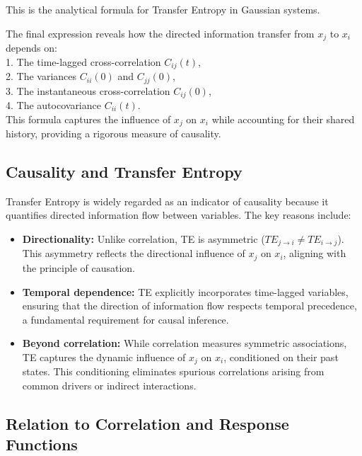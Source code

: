 \documentclass[English, Lau, oneside]{sapthesis}
\begin{document}
This is the analytical formula for Transfer Entropy in Gaussian systems.

The final expression reveals how the directed information transfer from \(x_j\) to \(x_i\) depends on:\\
1. The time-lagged cross-correlation \(C_{ij}(t)\),\\
2. The variances \(C_{ii}(0)\) and \(C_{jj}(0)\),\\
3. The instantaneous cross-correlation \(C_{ij}(0)\),\\
4. The autocovariance \(C_{ii}(t)\).\\

This formula captures the influence of \(x_j\) on \(x_i\) while accounting for their shared history, providing a rigorous measure of causality.

\subsection{Causality and Transfer Entropy}

\noindent Transfer Entropy is widely regarded as an indicator of causality because it quantifies directed information flow between variables. The key reasons include:

\begin{itemize}
    \item \textbf{Directionality:} Unlike correlation, TE is asymmetric (\(TE_{j \to i} \neq TE_{i \to j}\)). This asymmetry reflects the directional influence of \(x_j\) on \(x_i\), aligning with the principle of causation.
    \item \textbf{Temporal dependence:} TE explicitly incorporates time-lagged variables, ensuring that the direction of information flow respects temporal precedence, a fundamental requirement for causal inference.
    \item \textbf{Beyond correlation:} While correlation measures symmetric associations, TE captures the dynamic influence of \(x_j\) on \(x_i\), conditioned on their past states. This conditioning eliminates spurious correlations arising from common drivers or indirect interactions.
\end{itemize}

\subsection{Relation to Correlation and Response Functions}
\end{document}
